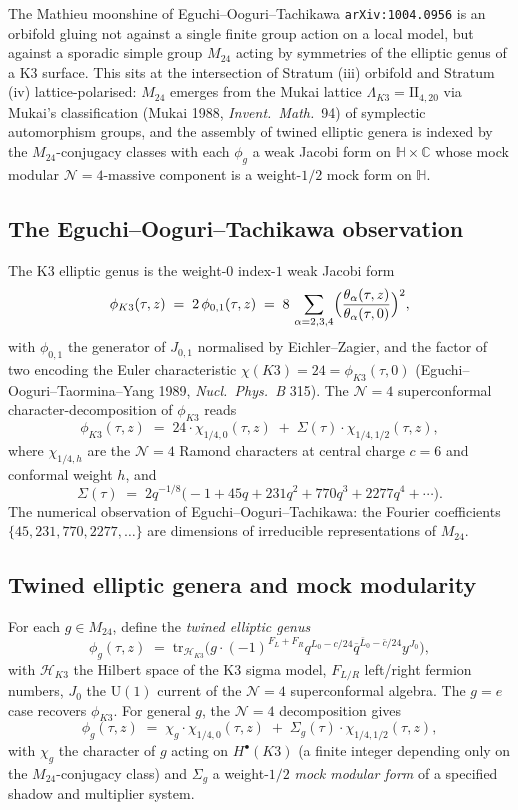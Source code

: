 The Mathieu moonshine of Eguchi--Ooguri--Tachikawa \texttt{arXiv:1004.0956} is an orbifold gluing not against a single finite group action on a local model, but against a sporadic simple group $M_{24}$ acting by symmetries of the elliptic genus of a K3 surface. This sits at the intersection of Stratum (iii) orbifold and Stratum (iv) lattice-polarised: $M_{24}$ emerges from the Mukai lattice $\Lambda_{K3} = \mathrm{II}_{4, 20}$ via Mukai's classification (Mukai 1988, \emph{Invent.\ Math.}\ 94) of symplectic automorphism groups, and the assembly of twined elliptic genera is indexed by the $M_{24}$-conjugacy classes with each $\phi_g$ a weak Jacobi form on $\mathbb{H} \times \mathbb{C}$ whose mock modular $\mathcal{N} = 4$-massive component is a weight-$1/2$ mock form on $\mathbb{H}$.

\subsection{The Eguchi--Ooguri--Tachikawa observation}
\label{subsec:eot-observation}

The K3 elliptic genus is the weight-$0$ index-$1$ weak Jacobi form
\[
\phi_{K3}(\tau, z) \;=\; 2 \, \phi_{0, 1}(\tau, z) \;=\; 8 \, \sum_{\alpha = 2, 3, 4} \Bigl(\frac{\theta_\alpha(\tau, z)}{\theta_\alpha(\tau, 0)}\Bigr)^2,
\]
with $\phi_{0, 1}$ the generator of $J_{0, 1}$ normalised by Eichler--Zagier, and the factor of two encoding the Euler characteristic $\chi(K3) = 24 = \phi_{K3}(\tau, 0)$ (Eguchi--Ooguri--Taormina--Yang 1989, \emph{Nucl.\ Phys.\ B} 315).
The $\mathcal{N}=4$ superconformal character-decomposition of $\phi_{K3}$ reads
\[
\phi_{K3}(\tau, z) \;=\; 24 \cdot \chi_{1/4, 0}(\tau, z) \;+\; \Sigma(\tau) \cdot \chi_{1/4, 1/2}(\tau, z),
\]
where $\chi_{1/4, h}$ are the $\mathcal{N}=4$ Ramond characters at central charge $c = 6$ and conformal weight $h$, and
\[
\Sigma(\tau) \;=\; 2 q^{-1/8}\bigl(-1 + 45 q + 231 q^2 + 770 q^3 + 2277 q^4 + \cdots\bigr).
\]
The numerical observation of Eguchi--Ooguri--Tachikawa: the Fourier coefficients $\{45, 231, 770, 2277, \dots\}$ are dimensions of irreducible representations of $M_{24}$.

\subsection{Twined elliptic genera and mock modularity}
\label{subsec:twined-mock}

For each $g \in M_{24}$, define the \emph{twined elliptic genus}
\[
\phi_g(\tau, z) \;=\; \mathrm{tr}_{\mathcal{H}_{K3}}\bigl(g \cdot (-1)^{F_L + F_R} q^{L_0 - c/24} \overline{q}^{\bar{L}_0 - \bar{c}/24} y^{J_0}\bigr),
\]
with $\mathcal{H}_{K3}$ the Hilbert space of the K3 sigma model, $F_{L/R}$ left/right fermion numbers, $J_0$ the $\mathrm{U}(1)$ current of the $\mathcal{N}=4$ superconformal algebra. The $g = e$ case recovers $\phi_{K3}$. For general $g$, the $\mathcal{N}=4$ decomposition gives
\[
\phi_g(\tau, z) \;=\; \chi_g \cdot \chi_{1/4, 0}(\tau, z) \;+\; \Sigma_g(\tau) \cdot \chi_{1/4, 1/2}(\tau, z),
\]
with $\chi_g$ the character of $g$ acting on $H^\bullet(K3)$ (a finite integer depending only on the $M_{24}$-conjugacy class) and $\Sigma_g$ a weight-$1/2$ \emph{mock modular form} of a specified shadow and multiplier system.

